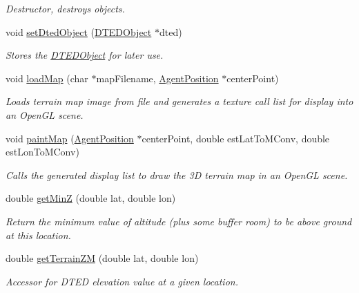 \begin{DoxyCompactItemize}
\begin{DoxyCompactList}\small\item\em Destructor, destroys objects. \end{DoxyCompactList}\item 
void \hyperlink{class_map_data_aff0de8ebb5a9854c9ff3f538622d996b}{setDtedObject} (\hyperlink{class_d_t_e_d_object}{DTEDObject} $\ast$dted)
\begin{DoxyCompactList}\small\item\em Stores the \hyperlink{class_d_t_e_d_object}{DTEDObject} for later use. \end{DoxyCompactList}\item 
void \hyperlink{class_map_data_ae1279a256d75913e6e2dbe712820974c}{loadMap} (char $\ast$mapFilename, \hyperlink{class_agent_position}{AgentPosition} $\ast$centerPoint)
\begin{DoxyCompactList}\small\item\em Loads terrain map image from file and generates a texture call list for display into an OpenGL scene. \end{DoxyCompactList}\item 
void \hyperlink{class_map_data_a359ee893b6a65bbd6fa7be2b28931f28}{paintMap} (\hyperlink{class_agent_position}{AgentPosition} $\ast$centerPoint, double estLatToMConv, double estLonToMConv)
\begin{DoxyCompactList}\small\item\em Calls the generated display list to draw the 3D terrain map in an OpenGL scene. \end{DoxyCompactList}\item 
double \hyperlink{class_map_data_a49e6635de521d2b1707f76904bff6a2a}{getMinZ} (double lat, double lon)
\begin{DoxyCompactList}\small\item\em Return the minimum value of altitude (plus some buffer room) to be above ground at this location. \end{DoxyCompactList}\item 
double \hyperlink{class_map_data_ac596a85c37b11e4dad4a5e4dabcfece1}{getTerrainZM} (double lat, double lon)
\begin{DoxyCompactList}\small\item\em Accessor for DTED elevation value at a given location. \end{DoxyCompactList}\end{DoxyCompactItemize}
